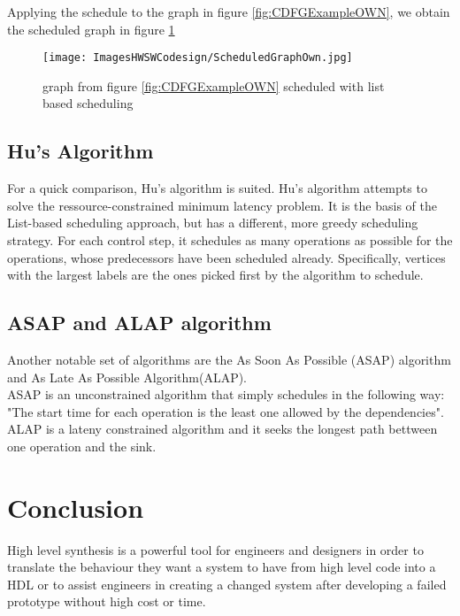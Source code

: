 \documentclass[conference]{IEEEtran}
\begin{document}
Applying the schedule to the graph in figure \ref{fig:CDFGExampleOWN}, we obtain the scheduled graph in figure \ref{fig:ScheduledExampleOWN}

\begin{figure}[htbp]
    \centering
    \texttt{[image: ImagesHWSWCodesign/ScheduledGraphOwn.jpg]}
    \caption{graph from figure \ref{fig:CDFGExampleOWN} scheduled with list based scheduling}
    \label{fig:ScheduledExampleOWN}
\end{figure}

\subsection{Hu's Algorithm}
For a quick comparison, Hu's algorithm is suited. Hu’s algorithm attempts to solve the ressource-constrained minimum latency problem. It is the basis of the List-based scheduling approach, but has a different, more greedy scheduling strategy. For each control step, it schedules as many operations as possible for the operations, whose predecessors have been scheduled already. Specifically, vertices with the largest labels are the ones picked first by the algorithm to schedule\cite{SynthesisAndOptimization}.

\subsection{ASAP and ALAP algorithm}
Another notable set of algorithms are the As Soon As Possible (ASAP) algorithm and As Late As Possible Algorithm(ALAP).\\

ASAP is an unconstrained algorithm that simply schedules in the following way: "The start time for each operation is the least one allowed by the dependencies"\cite{SynthesisAndOptimization}.\\

ALAP is a lateny constrained algorithm and it seeks the longest path bettween one operation and the sink\cite{SynthesisAndOptimization}. 

\section{Conclusion}
High level synthesis is a powerful tool for engineers and designers in order to translate the behaviour they want a system to have from high level code into a HDL or to assist engineers in creating a changed system after developing a failed prototype without high cost or time.\\
\end{document}
